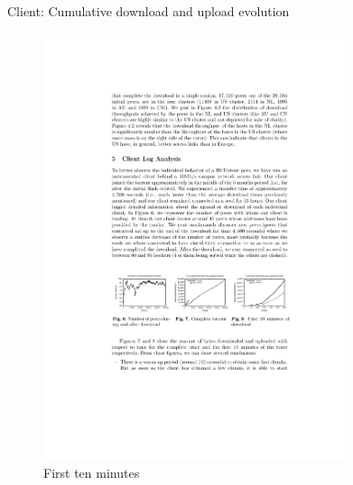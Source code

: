 \begin{frame}{Client: Cumulative download and upload evolution}
	
\begin{figure}	
	\includegraphics[width=0.79\textwidth]{bt-fig4}
	\caption{First ten minutes}
\end{figure}	
	
\end{frame}

